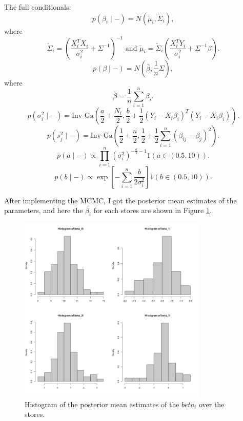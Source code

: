 \documentclass[11pt]{article}
\begin{document}
The full conditionals:
$$p(\beta_i \mid -) = N(\tilde{\mu}_i, \tilde{\Sigma}_i),$$
where $$\tilde{\Sigma}_i = \left( \frac{X_i^TX_i}{\sigma_i^2} + \Sigma^{-1} \right)^{-1} \text{ and } \tilde{\mu}_i = \tilde{\Sigma}_i \left( \frac{X_i^TY_i}{\sigma_i^2} + \Sigma^{-1}\beta \right).$$
$$p(\beta \mid - ) = N(\bar{\beta}, \frac{1}n \Sigma),$$
where $$\bar{\beta} = \frac{1}n \sum_{i=1}^n \beta_i.$$
$$p(\sigma_i^2 \mid -) = \text{Inv-Ga}(\frac{a}2 + \frac{N_i}2, \frac{b}2 + \frac{1}2(Y_i - X_i\beta_i)^T(Y_i - X_i\beta_i)).$$
$$p(s_j^2 \mid -) = \text{Inv-Ga}(\frac{1}2 + \frac{n}2, \frac{1}2 + \frac{1}2\sum_{i=1}^n (\beta_{ij}-\beta_j)^2).$$
$$p(a \mid -) \propto \prod_{i=1}^n (\sigma^2_i)^{-\frac{a}2 -1} 1(a \in (0.5,10)).$$
$$p(b \mid -) \propto \exp[- \sum_{i=1}^n \frac{b}{2\sigma_i^2}] 1(b \in (0.5,10)).$$

After implementing the MCMC, I got the posterior mean estimates of the parameters, and here the $\beta_i$ for each stores are shown in Figure \ref{fig:hist_betai}.
\begin{figure}[h]
    \centering
    \includegraphics[width=0.8\textwidth]{Ex5/figures/hist_betai.png}
    \caption{Histogram of the posterior mean estimates of the $beta_i$ over the stores.}
    \label{fig:hist_betai}
\end{figure}
\end{document}
